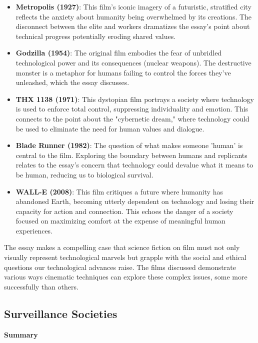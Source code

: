 \documentclass[11pt,fleqn]{book} %
\begin{document}
\begin{itemize}
\item \textbf{Metropolis (1927)}:  This film's iconic imagery of a futuristic, stratified city reflects the anxiety about humanity being overwhelmed by its creations. The disconnect between the elite and workers dramatizes the essay's point about technical progress potentially eroding shared values.

\item \textbf{Godzilla (1954)}:  The original film embodies the fear of unbridled technological power and its consequences (nuclear weapons). The destructive monster is a metaphor for humans failing to control the forces they've unleashed, which the essay discusses.

\item \textbf{THX 1138 (1971)}:  This dystopian film portrays a society where technology is used to enforce total control, suppressing individuality and emotion. This connects to the point about the "cybernetic dream," where technology could be used to eliminate the need for human values and dialogue.

\item \textbf{Blade Runner (1982)}:  The question of what makes someone 'human' is central to the film. Exploring the boundary between humans and replicants relates to the essay's concern that technology could devalue what it means to be human, reducing us to biological survival.

\item \textbf{WALL-E (2008)}: This film critiques a future where humanity has abandoned Earth, becoming utterly dependent on technology and losing their capacity for action and connection. This echoes the danger of a society focused on maximizing comfort at the expense of meaningful human experiences. 
\end{itemize}

\vspace{5pt}

The essay makes a compelling case that science fiction on film must not only visually represent technological marvels but grapple with the social and ethical questions our technological advances raise. The films discussed demonstrate various ways cinematic techniques can explore these complex issues, some more successfully than others. 




\subsection{Surveillance Societies}
\textbf{Summary}
\end{document}
